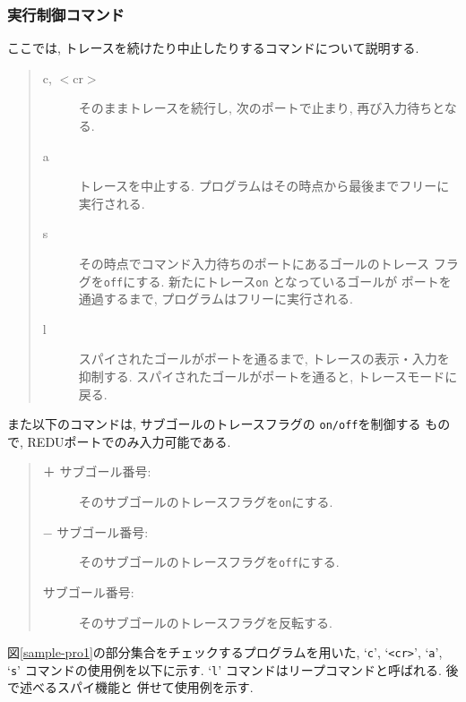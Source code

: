 \documentclass[a4,titlepage]{jsreport}
\begin{document}
\subsubsection{実行制御コマンド}

ここでは, トレースを続けたり中止したりするコマンドについて説明する.  

\begin{quote}
\begin{description}
\item[c, $<$cr$>$]  そのままトレースを続行し, 
次のポートで止まり, 再び入力待ちとなる.  

\item[a] トレースを中止する.  
プログラムはその時点から最後までフリーに実行される.  

\item[s] その時点でコマンド入力待ちのポートにあるゴールのトレース
フラグを{\tt off}にする.  新たにトレース{\tt on} となっているゴールが
ポートを通過するまで, プログラムはフリーに実行される.  

\item[l] スパイされたゴールがポートを通るまで, トレースの表示・入力を抑制する.
スパイされたゴールがポートを通ると, トレースモードに戻る.

\end{description}
\end{quote}

また以下のコマンドは, サブゴールのトレースフラグの {\tt on/off}を制御する
もので, REDUポートでのみ入力可能である.  

\begin{quote}
\begin{description}
\item [＋ サブゴール番号:] そのサブゴールのトレースフラグを{\tt on}にする.  
\item [− サブゴール番号:] そのサブゴールのトレースフラグを{\tt off}にする.  
\item [サブゴール番号:]   そのサブゴールのトレースフラグを反転する.  
\end{description}
\end{quote}

図\ref{sample-pro1}の部分集合をチェックするプログラムを用いた, 
`{\tt c}', `{\tt <cr>}', `{\tt a}', `{\tt s}' コマンドの使用例を以下に示す.  
`{\tt l}' コマンドはリープコマンドと呼ばれる.  後で述べるスパイ機能と
併せて使用例を示す. 
\end{document}
